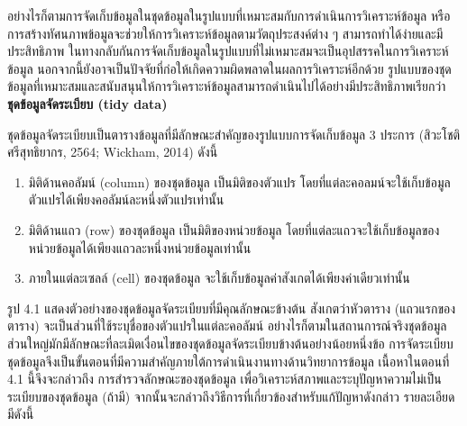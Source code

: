 \documentclass[
  letterpaper,
  DIV=11,
  numbers=noendperiod]{scrreprt}
\providecommand{\tightlist}{%
  \setlength{\itemsep}{0pt}\setlength{\parskip}{0pt}}\usepackage{longtable,booktabs,array}
\begin{document}
อย่างไรก็ตามการจัดเก็บข้อมูลในชุดข้อมูลในรูปแบบที่เหมาะสมกับการดำเนินการวิเคราะห์ข้อมูล
หรือการสร้างทัศนภาพข้อมูลจะช่วยให้การวิเคราะห์ข้อมูลตามวัตถุประสงค์ต่าง ๆ
สามารถทำได้ง่ายและมีประสิทธิภาพ
ในทางกลับกันการจัดเก็บข้อมูลในรูปแบบที่ไม่เหมาะสมจะเป็นอุปสรรคในการวิเคราะห์ข้อมูล
นอกจากนี้ยังอาจเป็นปัจจัยที่ก่อให้เกิดความผิดพลาดในผลการวิเคราะห์อีกด้วย
รูปแบบของชุดข้อมูลที่เหมาะสมและสนับสนุนให้การวิเคราะห์ข้อมูลสามารถดำเนินไปได้อย่างมีประสิทธิภาพเรียกว่า
\textbf{ชุดข้อมูลจัดระเบียบ (tidy data)}

ชุดข้อมูลจัดระเบียบเป็นตารางข้อมูลที่มีลักษณะสำคัญของรูปแบบการจัดเก็บข้อมูล 3 ประการ
(สิวะโชติ ศรีสุทธิยากร, 2564; Wickham, 2014) ดังนี้

\begin{enumerate}
\def\labelenumi{\arabic{enumi}.}
\tightlist
\item
  มิติด้านคอลัมน์ (column) ของชุดข้อมูล เป็นมิติของตัวแปร
  โดยที่แต่ละคอลมน์จะใช้เก็บข้อมูลตัวแปรได้เพียงคอลัมน์ละหนึ่งตัวแปรเท่านั้น
\item
  มิติด้านแถว (row) ของชุดข้อมูล เป็นมิติของหน่วยข้อมูล
  โดยที่แต่ละแถวจะใช้เก็บข้อมูลของหน่วยข้อมูลได้เพียงแถวละหนึ่งหน่วยข้อมูลเท่านั้น
\item
  ภายในแต่ละเซลล์ (cell) ของชุดข้อมูล จะใช้เก็บข้อมูลค่าสังเกตได้เพียงค่าเดียวเท่านั้น
\end{enumerate}

รูป 4.1 แสดงตัวอย่างของชุดข้อมูลจัดระเบียบที่มีคุณลักษณะข้างต้น สังเกตว่าหัวตาราง
(แถวแรกของตาราง) จะเป็นส่วนที่ใช้ระบุชื่อของตัวแปรในแต่ละคอลัมน์
อย่างไรก็ตามในสถานการณ์จริงชุดข้อมูลส่วนใหญ่มักมีลักษณะที่ละเมิดเงื่อนไขของชุดข้อมูลจัดระเบียบข้างต้นอย่างน้อยหนึ่งข้อ
การจัดระเบียบชุดข้อมูลจึงเป็นขั้นตอนที่มีความสำคัญภายใต้การดำเนินงานทางด้านวิทยาการข้อมูล
เนื้อหาในตอนที่ 4.1 นี้จึงจะกล่าวถึง การสำรวจลักษณะของชุดข้อมูล
เพื่อวิเคราะห์สภาพและระบุปัญหาความไม่เป็นระเบียบของชุดข้อมูล (ถ้ามี)
จากนั้นจะกล่าวถึงวิธีการที่เกี่ยวข้องสำหรับแก้ปัญหาดังกล่าว รายละเอียดมีดังนี้
\end{document}
